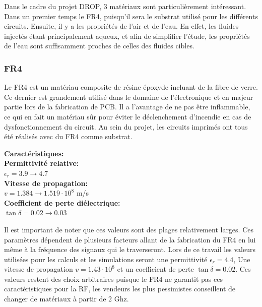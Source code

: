 \documentclass[12pt]{article}
\begin{document}
\vspace{0.5cm}
Dans le cadre du projet DROP, 3 matériaux sont particulièrement intéressant. Dans un premier temps le FR4, puisqu'il sera le substrat utilisé pour les différents circuits. Ensuite, il y a les propriétés de l'air et de l'eau. En effet, les fluides injectés étant principalement aqueux, et afin de simplifier l'étude, les propriétés de l'eau sont suffisamment proches de celles des fluides cibles.

\vspace{1cm}
\subsubsection{FR4}
Le FR4 est un matériau composite de résine époxyde incluant de la fibre de verre. Ce dernier est grandement utilisé dans le domaine de l’électronique et en majeur partie lors de la fabrication de PCB. Il a l'avantage de ne pas être inflammable, ce qui en fait un matériau sûr pour éviter le déclenchement d'incendie en cas de dysfonctionnement du circuit. Au sein du projet, les circuits imprimés ont tous été réalisés avec du FR4 comme substrat.

\vspace{1cm}
{\large\textbf{Caractéristiques:}}
\vspace{0.5cm} \\
\textbf{Permittivité relative:} \\
$\epsilon_r = 3.9 \to 4.7$
\vspace{0.5cm}\\
\textbf{Vitesse de propagation:} \\
$v = 1.384 \to 1.519 \cdot 10^8$ m/s
\vspace{0.5cm}\\
\textbf{Coefficient de perte diélectrique:}\\
$\tan\delta = 0.02 \to 0.03$ 
\vspace{1cm}

Il est important de noter que ces valeurs sont des plages relativement larges. Ces paramètres dépendent de plusieurs facteurs allant de la fabrication du FR4 en lui même à la fréquence des signaux qui le traverseront. Lors de ce travail les valeurs utilisées pour les calculs et les simulations seront une permittivité $\epsilon_r = 4.4$, Une vitesse de propagation $v=1.43 \cdot 10^8$ et un coefficient de perte $\tan\delta=0.02$. Ces valeurs restent des choix arbitraires puisque le FR4 ne garantit pas ces caractéristiques pour la RF, les vendeurs les plus pessimistes conseillent de changer de matériaux à partir de 2 Ghz.
\end{document}
